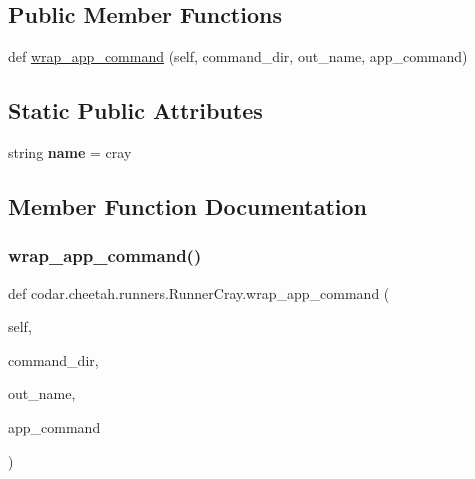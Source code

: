 \subsection*{Public Member Functions}
\begin{DoxyCompactItemize}
\item 
def \hyperlink{classcodar_1_1cheetah_1_1runners_1_1_runner_cray_a48e00e865bfdfffcaf6f3f8030820f70}{wrap\+\_\+app\+\_\+command} (self, command\+\_\+dir, out\+\_\+name, app\+\_\+command)
\end{DoxyCompactItemize}
\subsection*{Static Public Attributes}
\begin{DoxyCompactItemize}
\item 
\mbox{\label{classcodar_1_1cheetah_1_1runners_1_1_runner_cray_af39659e3752a349dcac224089a410a0f}} 
string {\bfseries name} = \textquotesingle{}cray\textquotesingle{}
\end{DoxyCompactItemize}


\subsection{Member Function Documentation}
\mbox{\label{classcodar_1_1cheetah_1_1runners_1_1_runner_cray_a48e00e865bfdfffcaf6f3f8030820f70}} 
\subsubsection{\texorpdfstring{wrap\+\_\+app\+\_\+command()}{wrap\_app\_command()}}
{\footnotesize\ttfamily def codar.\+cheetah.\+runners.\+Runner\+Cray.\+wrap\+\_\+app\+\_\+command (\begin{DoxyParamCaption}\item[{}]{self,  }\item[{}]{command\+\_\+dir,  }\item[{}]{out\+\_\+name,  }\item[{}]{app\+\_\+command }\end{DoxyParamCaption})}

